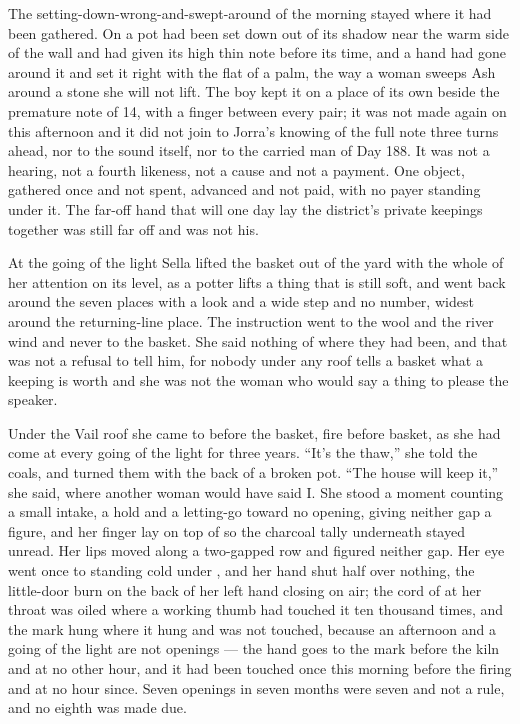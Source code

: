 The setting-down-wrong-and-swept-around of the morning stayed where it had been gathered. On  a pot had been set down out of its shadow near the warm side of the wall and had given its high thin note before its time, and a hand had gone around it and set it right with the flat of a palm, the way a woman sweeps Ash around a stone she will not lift. The boy kept it on a place of its own beside the premature note of  14, with a finger between every pair; it was not made again on this afternoon and it did not join to Jorra's knowing of the full note three turns ahead, nor to the sound itself, nor to the carried man of Day 188. It was not a hearing, not a fourth likeness, not a cause and not a payment. One object, gathered once and not spent, advanced and not paid, with no payer standing under it. The far-off hand that will one day lay the district's private keepings together was still far off and was not his.

At the going of the light Sella lifted the basket out of the yard with the whole of her attention on its level, as a potter lifts a thing that is still soft, and went back around the seven places with a look and a wide step and no number, widest around the returning-line place. The instruction went to the wool and the river wind and never to the basket. She said nothing of where they had been, and that was not a refusal to tell him, for nobody under any roof tells a basket what a keeping is worth and she was not the woman who would say a thing to please the speaker.

Under the Vail roof she came to  before the basket, fire before basket, as she had come at every going of the light for three years. “It's the thaw,” she told the coals, and turned them with the back of a broken pot. “The house will keep it,” she said, where another woman would have said I. She stood a moment counting a small intake, a hold and a letting-go toward no opening, giving neither gap a figure, and her finger lay on top of  so the charcoal tally underneath stayed unread. Her lips moved along a two-gapped row and figured neither gap. Her eye went once to  standing cold under , and her hand shut half over nothing, the little-door burn on the back of her left hand closing on air; the cord of  at her throat was oiled where a working thumb had touched it ten thousand times, and the mark hung where it hung and was not touched, because an afternoon and a going of the light are not openings --- the hand goes to the mark before the kiln and at no other hour, and it had been touched once this morning before the firing and at no hour since. Seven openings in seven months were seven and not a rule, and no eighth was made due.

